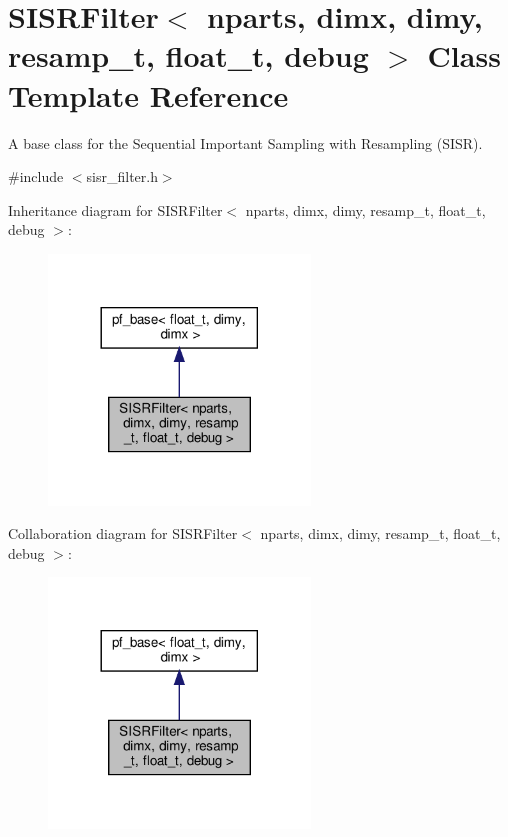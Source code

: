 \hypertarget{classSISRFilter}{}\section{S\+I\+S\+R\+Filter$<$ nparts, dimx, dimy, resamp\+\_\+t, float\+\_\+t, debug $>$ Class Template Reference}
\label{classSISRFilter}


A base class for the Sequential Important Sampling with Resampling (S\+I\+SR).  




{\ttfamily \#include $<$sisr\+\_\+filter.\+h$>$}



Inheritance diagram for S\+I\+S\+R\+Filter$<$ nparts, dimx, dimy, resamp\+\_\+t, float\+\_\+t, debug $>$\+:
\nopagebreak
\begin{figure}[H]
\begin{center}
\leavevmode
\includegraphics[width=197pt]{classSISRFilter__inherit__graph}
\end{center}
\end{figure}


Collaboration diagram for S\+I\+S\+R\+Filter$<$ nparts, dimx, dimy, resamp\+\_\+t, float\+\_\+t, debug $>$\+:
\nopagebreak
\begin{figure}[H]
\begin{center}
\leavevmode
\includegraphics[width=197pt]{classSISRFilter__coll__graph}
\end{center}
\end{figure}
